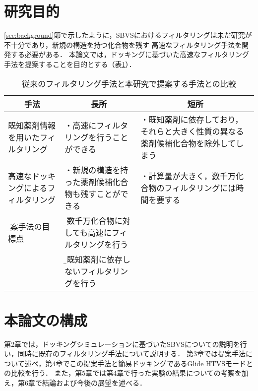 \section{研究目的}
\ref{sec:background}節で示したように，SBVSにおけるフィルタリングは未だ研究が不十分であり，新規の構造を持つ化合物を残す
高速なフィルタリング手法を開発する必要がある．
本論文では，ドッキングに基づいた高速なフィルタリング手法を提案することを目的とする（表\ref{table:filtering_aim}）．

\begin{table}[t] \centering
	\caption{従来のフィルタリング手法と本研究で提案する手法との比較}
	\label{table:filtering_aim}
	\begin{tabular}{p{3.5cm}p{6cm}p{6cm}}
	\hline
	\multicolumn{1}{c}{手法}&\multicolumn{1}{c}{長所}&\multicolumn{1}{c}{短所} \\ \hline
	既知薬剤情報を用いたフィルタリング&・高速にフィルタリングを行うことができる&・既知薬剤に依存しており，それらと大きく性質の異なる薬剤候補化合物を除外してしまう \\ \hline
	高速なドッキングによるフィルタリング&・新規の構造を持った薬剤候補化合物も残すことができる	&・計算量が大きく，数千万化合物のフィルタリングには時間を要する	\\ \hline
	\b{\large 提案手法の目標点}&\b{\large・数千万化合物に対しても高速にフィルタリングを行う}& \\
	&\b{\large・既知薬剤に依存しないフィルタリングを行う}	&	\\ \hline
	\end{tabular}	
\end{table}

\section{本論文の構成}
第2章では，ドッキングシミュレーションに基づいたSBVSについての説明を行い，同時に既存のフィルタリング手法について説明する．
第3章では提案手法について述べ，第4章でこの提案手法と簡易ドッキングであるGlide HTVSモードとの比較を行う．
また，第5章では第4章で行った実験の結果についての考察を加え，第6章で結論および今後の展望を述べる．